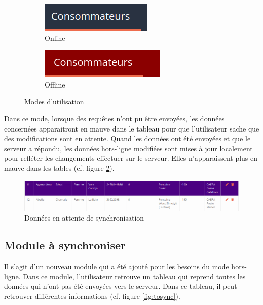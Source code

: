 \documentclass{EPL-master-thesis-covers-FR}
\begin{document}
				\begin{figure}[H]
					\centering
					\begin{subfigure}[b]{0.3\textwidth}
  						\includegraphics[width=1\linewidth]{images/consumer_blue}
  						\caption{Online}
					\end{subfigure}%
					\begin{subfigure}[b]{0.332\textwidth}
  						\includegraphics[width=1\linewidth]{images/consumer_red}
  						\caption{Offline}
					\end{subfigure}
					\caption{Modes d'utilisation}
					\label{fig:mode}
				\end{figure}
			
				Dans ce mode, lorsque des requêtes n'ont pu être envoyées, les données concernées apparaitront en mauve dans le tableau pour que l'utilisateur sache que des modifications sont en attente. Quand les données ont été envoyées et que le serveur a répondu, les données hors-ligne modifiées sont mises à jour localement pour refléter les changements effectuer sur le serveur. Elles n'apparaissent plus en mauve dans les tables (cf. figure \ref{fig:purple}). 
				
				\begin{figure}[H]
					\centering
					\includegraphics[width=1\textwidth]{images/purple}
					\caption{Données en attente de synchronisation}
					\label{fig:purple}
				\end{figure}
				
							
			\subsection*{Module à synchroniser}
				Il s'agit d'un nouveau module qui a été ajouté pour les besoins du mode hors-ligne. Dans ce module, l'utilisateur retrouve un tableau qui reprend toutes les données qui n'ont pas été envoyées vers le serveur. Dans ce tableau, il peut retrouver différentes informations (cf. figure \ref{fig:tosync}).
				
\end{document}
